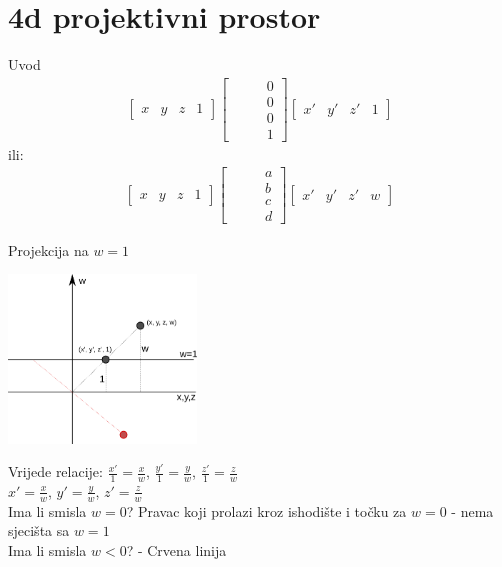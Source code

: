 \documentclass[9pt]{beamer}
\begin{document}
\section{4d projektivni prostor}
\begin{frame}{Uvod}
	\begin{align*}
	\left[ \begin{array}{cccc}
	x & y & z & 1 \end{array} \right] 
	\left[ \begin{array}{cccc}
	&  &  & 0 \\
	&  &  & 0 \\
	&  &  & 0 \\
	&  &  & 1 
	\end{array} \right] \left[ \begin{array}{cccc} x' & y' & z' & 1 \end{array} \right] 
	\end{align*}
	ili:
	\begin{align*}
	\left[ \begin{array}{cccc}
	x & y & z & 1 \end{array} \right] 
	\left[ \begin{array}{cccc}
	&  &  & a \\
	&  &  & b \\
	&  &  & c \\
	&  &  & d 
	\end{array} \right] \left[ \begin{array}{cccc} x' & y' & z' & w \end{array} \right] 
	\end{align*}
\end{frame}

\begin{frame}{Projekcija na $w=1$}
	\begin{center}
		\includegraphics[width=5cm]{./slike/p04_05.png}
	\end{center}
	Vrijede relacije:
	$\frac{x'}{1} = \frac{x}{w}$, $\frac{y'}{1} = \frac{y}{w}$, $\frac{z'}{1} = \frac{z}{w}$\\
	$x' = \frac{x}{w}$, $y' = \frac{y}{w}$, $z' = \frac{z}{w}$\\
	Ima li smisla $w=0$? Pravac koji prolazi kroz ishodište i točku za $w=0$ - nema sjecišta sa $w=1$ \\
	Ima li smisla $w < 0$? - Crvena linija
\end{frame}
\end{document}

